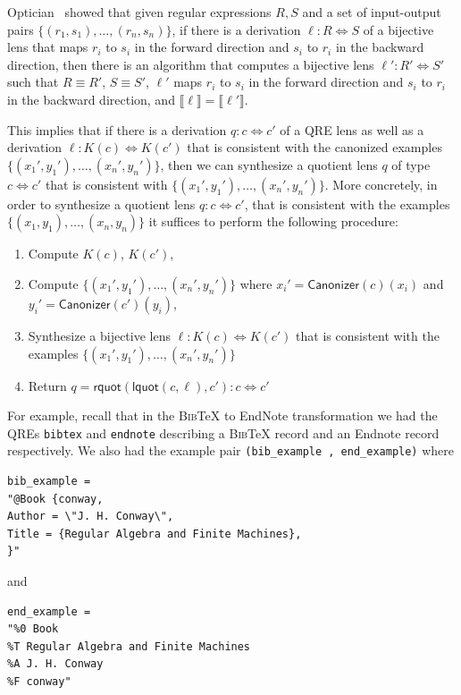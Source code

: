 \documentclass[acmsmall,review,anonymous]{acmart}
\newcommand{\kw}[1]{\ensuremath{\mathsf{#1}}}
\newcommand{\canonizer}{\ensuremath{\kw{Canonizer}}}
\newcommand{\bibtex}{\textsc{Bib}\TeX{}}
\newcommand{\cd}[1]{\lstinline[backgroundcolor=\color{white}]$#1$}
\begin{document}
Optician~\cite{optician} showed that given regular expressions
$R, S$ and a set of input-output pairs $\{(r_1, s_1), \ldots, (r_n, s_n)\}$, if
there is a derivation $\ell : R \Leftrightarrow S$ of a bijective lens that
maps $r_i$ to $s_i$ in the forward direction and $s_i$ to $r_i$ in the backward
direction, then there is an algorithm that computes a bijective lens $\ell' :
R' \Leftrightarrow S'$ such that $R \equiv R'$, $S \equiv S'$, $\ell'$ maps
$r_i$ to $s_i$ in the forward direction and $s_i$ to $r_i$ in the backward
direction, and $\llbracket \ell \rrbracket = \llbracket \ell'
\rrbracket$.

This implies that if there is a derivation $q : c \Leftrightarrow
c'$ of a QRE lens as well as a derivation $\ell : K(c) \Leftrightarrow K(c')$
that is consistent with the canonized examples $\{({x_1}', {y_1}'),
\ldots, ({x_n}', {y_n}')\}$, then we can synthesize a quotient lens $q$ of
type $c \Leftrightarrow c'$ that is consistent with $\{({x_1}', {y_1}'),
\ldots, ({x_n}', {y_n}')\}$. More concretely, in order to synthesize a
quotient lens $q: c \Leftrightarrow c'$, that is consistent with the examples
$\{(x_1, y_1), \ldots, (x_n, y_n)\}$ it suffices to perform the following
procedure:
\begin{enumerate}
  \item
  Compute $K(c)$, $K(c')$,
  \item
  Compute $\{({x_1}', {y_1}'), \ldots, ({x_n}', {y_n}')\}$ where ${x_i}' =
  \canonizer(c)(x_i)$ and ${y_i}' = \canonizer(c')(y_i)$,
  \item
  Synthesize a bijective lens $\ell : K(c) \Leftrightarrow K(c')$ that is
  consistent with the examples $\{({x_1}', {y_1}'), \ldots, ({x_n}',
  {y_n}')\}$
  \item
  Return $q = \kw{rquot}(\kw{lquot}(c, \ell), c') : c \Leftrightarrow
  c'$
\end{enumerate}
For example, recall that in the \bibtex{} to EndNote transformation we had the
QREs \cd{bibtex} and \cd{endnote} describing a \bibtex{} record and an Endnote
record respectively. We also had the example pair \cd{(bib_example ,
end_example)} where

\begin{lstlisting}
bib_example =
"@Book {conway,
Author = \"J. H. Conway\",
Title = {Regular Algebra and Finite Machines},
}"
\end{lstlisting}

\noindent and

\begin{lstlisting}
end_example =
"%0 Book
%T Regular Algebra and Finite Machines
%A J. H. Conway
%F conway"
\end{lstlisting}
\end{document}
